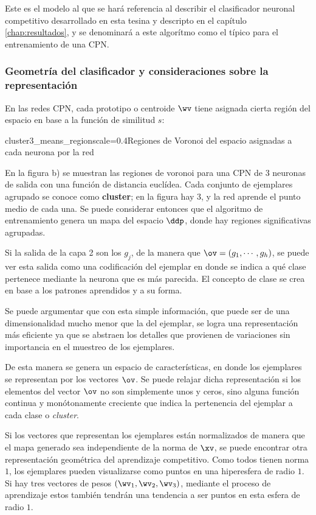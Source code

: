 Este es el modelo al que se hará referencia al describir el clasificador neuronal competitivo desarrollado en esta tesina y descripto en el capítulo \ref{chap:resultados}, y se denominará a este algorítmo como el típico para el entrenamiento de una CPN.

\subsubsection*{Geometría del clasificador y consideraciones sobre la representación}

En las redes CPN, cada prototipo o centroide $\wv$ tiene asignada cierta región del espacio en base a la función de similitud $s$:

{cluster3_means_region}{scale=0.4}{Regiones de Voronoi del espacio asignadas a cada neurona por la red}

En la figura b) se muestran las regiones de voronoi para una CPN de 3 neuronas de salida con una función de distancia euclídea. Cada conjunto de ejemplares agrupado se conoce como \textbf{cluster}; en la figura hay 3, y la red aprende el punto medio de cada una. Se puede considerar entonces que el algoritmo de entrenamiento genera un mapa del espacio $\ddp$, donde hay regiones significativas agrupadas.

Si la salida de la capa 2 son los $g_j$, de la manera que $\ov= (g_1,\cdots,g_h)$, se puede ver esta salida como una codificación del ejemplar en donde se indica a qué clase pertenece mediante la neurona que es más parecida. El concepto de clase se crea en base a los patrones aprendidos y a su forma.

Se puede argumentar que con esta simple información, que puede ser de una dimensionalidad mucho menor que la del ejemplar, se logra una representación más eficiente ya que se abstraen los detalles que provienen de variaciones  sin importancia en el muestreo de los ejemplares. 

De esta manera se genera un espacio de características, en donde los ejemplares se representan por los vectores $\ov$. Se puede relajar dicha representación si los elementos del vector $\ov$ no son simplemente unos y ceros, sino alguna función continua y monótonamente creciente que indica la pertenencia del ejemplar a cada clase o \textit{cluster}.

Si los vectores que representan los ejemplares están normalizados de manera que el mapa generado sea independiente de la norma de $\xv$, se puede encontrar otra representación geométrica del aprendizaje competitivo.  Como todos tienen norma $1$, los ejemplares pueden visualizarse como puntos en una hiperesfera de radio $1$. Si hay tres vectores de pesos $(\wv_1,\wv_2,\wv_3)$, mediante el proceso de aprendizaje estos también tendrán una tendencia a ser puntos en esta esfera de radio $1$.

